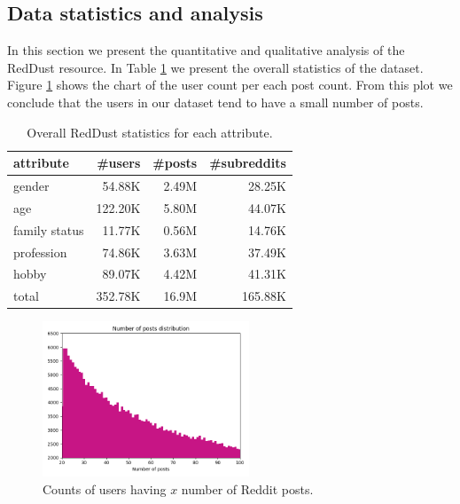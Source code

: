 \subsection{Data statistics and analysis}

In this section we present the quantitative and qualitative analysis of the RedDust resource. In Table \ref{stats_table} we present the overall
statistics of the dataset. Figure \ref{num_posts} shows the chart of the user count per each post count. From this plot we conclude that the users in our dataset tend to have a small number of posts.

\begin{table}[h!]%
\centering
\small
\begin{adjustbox}{width=0.55\textwidth}
\begin{tabular}{lrrr}
\toprule
\textbf{attribute} & \textbf{\#users} & \textbf{\#posts} & \textbf{\#subreddits} \\
\midrule
gender & 54.88K & 2.49M & 28.25K \\
age & 122.20K & 5.80M & 44.07K \\
family status & 11.77K & 0.56M & 14.76K \\
profession & 74.86K & 3.63M & 37.49K \\
hobby & 89.07K & 4.42M & 41.31K \\
\midrule
total & 352.78K & 16.9M & 165.88K \\
\bottomrule
\end{tabular}
\end{adjustbox}
\caption{Overall RedDust statistics for each attribute.}
\label{stats_table}
\end{table}

\begin{figure}[!h]
\centering
\includegraphics[width=0.55\textwidth]{data/pics/num_posts.png}
\caption{Counts of users having $x$ number of Reddit posts.}
\label{num_posts}
\end{figure}

